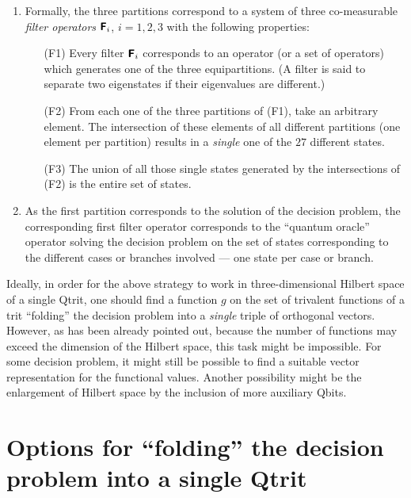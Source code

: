 \documentclass{article}
\begin{document}
\begin{enumerate}
\item
Formally, the three partitions correspond to a system of three co-measurable
{\em filter operators} $\textsf{\textbf{F}}_i$, $i=1,2,3$
with the following properties:
\begin{enumerate}
\item[(F1)]
Every filter $\textsf{\textbf{F}}_i$
corresponds to an operator (or a set of operators)
which generates one of the three
equipartitions.
(A filter is said to separate two eigenstates if their eigenvalues are different.)
\item[(F2)]
From each one of the three partitions of (F1), take an arbitrary element.
The intersection of these elements of all different partitions (one element per partition)
results in a {\it single} one of the $27$ different states.
\item[(F3)]
The union of all those single states generated by the intersections of (F2)
is the entire set of states.
\end{enumerate}

\item
As the first partition corresponds to the solution of the decision problem,
the corresponding first filter operator corresponds to the ``quantum oracle'' operator solving the decision problem
on the set of states corresponding to the different cases or branches involved --- one state per case or branch.

\end{enumerate}


Ideally, in order for the above strategy to work in three-dimensional Hilbert space of a single Qtrit,
one should find a function $g$ on the set of trivalent functions of a trit ``folding'' the decision problem  into a  {\em single} triple of orthogonal vectors.
However, as has been already pointed out, because the number of functions may exceed the dimension of the Hilbert space, this task might be impossible.
For some decision problem, it might still be possible to find a suitable vector representation for the functional values.
Another possibility might be the enlargement of Hilbert space by the inclusion of more auxiliary Qbits.

\section{Options for ``folding'' the decision problem into a single Qtrit}
\end{document}
